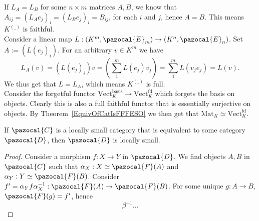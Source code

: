 \begin{example}
        If $L_A = L_B$ for some $n\times m$ matrices $A,B$, we know that $A_{ij}=(L_A e_j)_i = (L_B e_j)_i = B_{ij}$, for each $i$ and $j$, hence $A=B$. This means $K^{(\_)}$ is faithful.\\
        Consider a linear map $L : (K^m,\pazocal{E}_m)\rightarrow (K^n,\pazocal{E}_n)$. Set $A:= (L(e_j)_i)$. For an arbitrary $v\in K^m$ we have 
        $$
            L_A (v) = (L(e_j)_i) v = (\sum_1^m L(e_j) v_j)= \sum_1^m L(v_j e_j) = L(v). 
        $$
        We thus get that $L = L_A$, which means $K^{(\_)}$ is full.\\
        Consider the forgetful functor $\mathrm{Vect}_K^\mathrm{basis}\rightarrow \mathrm{Vect}_K^\mathrm{fd}$ which forgets the basis on objects. Clearly this is also a full faithful functor that is essentially surjective on objects. By Theorem~\ref{EquivOfCatIsFFFESO} we then get that $\mathrm{Mat}_K\simeq \mathrm{Vect}_K^\mathrm{fd}$.
    \end{example}
     \begin{proposition}
        If $\pazocal{C}$ is a locally small category that is equivalent to some category $\pazocal{D}$, then $\pazocal{D}$ is locally small. 
    \end{proposition}
    \begin{proof}
        Consider a morphism $f: X\rightarrow Y$ in $\pazocal{D}$. We find objects $A,B$ in $\pazocal{C}$ such that $\alpha_X: X\simeq \pazocal{F}(A)$ and $\alpha_Y : Y\simeq \pazocal{F}(B)$. Consider $f' = \alpha_Y f \alpha_X^{-1} : \pazocal{F}(A)\rightarrow \pazocal{F}(B)$. For some unique $g: A\rightarrow B$, $\pazocal{F}(g)=f'$, hence 
        $$
            \beta^{-1}...
        $$ 
    \end{proof}
